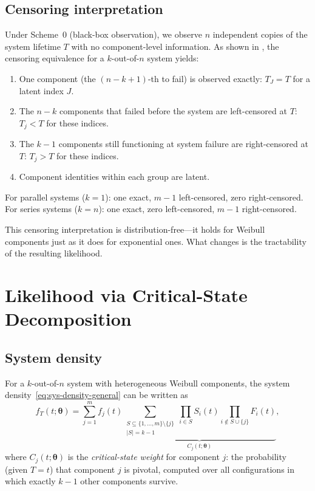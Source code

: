 \documentclass[12pt]{article}
\theoremstyle{definition}
\theoremstyle{remark}
\newcommand{\btheta}{\bm{\theta}}
\begin{document}
\subsection{Censoring interpretation}
\label{sec:censoring-interp}

Under Scheme~0 (black-box observation), we observe $n$
independent copies of the system lifetime $T$ with no
component-level information.  As shown in \citet{Towell2026}, the
censoring equivalence for a $k$-out-of-$n$ system yields:
\begin{enumerate}
\item[(a)] One component (the $(n-k+1)$-th to fail) is observed
  exactly: $T_J = T$ for a latent index $J$.
\item[(b)] The $n-k$ components that failed before the system are
  left-censored at $T$: $T_j < T$ for these indices.
\item[(c)] The $k-1$ components still functioning at system failure
  are right-censored at $T$: $T_j > T$ for these indices.
\item[(d)] Component identities within each group are latent.
\end{enumerate}
For parallel systems ($k = 1$): one exact, $m-1$ left-censored,
zero right-censored.  For series systems ($k = n$): one exact,
zero left-censored, $m-1$ right-censored.

This censoring interpretation is distribution-free---it holds for
Weibull components just as it does for exponential ones.  What
changes is the tractability of the resulting likelihood.


\section{Likelihood via Critical-State Decomposition}
\label{sec:likelihood}

\subsection{System density}

For a $k$-out-of-$n$ system with heterogeneous Weibull components,
the system density~\eqref{eq:sys-density-general} can be written as
\begin{equation}\label{eq:sys-density-kofn}
  f_T(t; \btheta) = \sum_{j=1}^m f_j(t)
  \underbrace{
    \sum_{\substack{S \subseteq \{1,\ldots,m\} \setminus \{j\} \\
    |S| = k-1}}
    \prod_{i \in S} S_i(t) \prod_{i \notin S \cup \{j\}} F_i(t)
  }_{C_j(t; \btheta)},
\end{equation}
where $C_j(t; \btheta)$ is the \emph{critical-state weight} for
component $j$: the probability (given $T = t$) that component $j$
is pivotal, computed over all configurations in which exactly $k-1$
other components survive.
\end{document}
